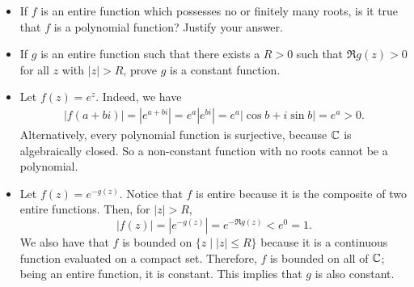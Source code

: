 \begin{problem}
\begin{itemize}
    \item[(a)] If $f$ is an entire function which possesses no or finitely many roots, is it true that $f$ is a polynomial function? Justify your answer. 
    \item[(b)] If $g$ is an entire function such that there exists a $R > 0$ such that $\Re g(z) > 0$ for all $z$ with $|z| > R$, prove $g$ is a constant function.
\end{itemize}
\begin{solution}
\begin{itemize}
    \item[(a)] Let $f(z) = e^z$. Indeed, we have 
    \begin{align*}
        |f(a + bi)| = |e^{a + bi}| = e^a |e^{bi}| = e^a|\cos b + i\sin b| = e^a > 0.
    \end{align*}
    Alternatively, every polynomial function is surjective, because $\mathbb{C}$ is algebraically closed. So a non-constant function with no roots cannot be a polynomial.

    \item[(b)] Let $f(z) = e^{-g(z)}$. Notice that $f$ is entire because it is the composite of two entire functions. Then, for $|z| > R$,
    $$ |f(z)| = |e^{-g(z)}| = e^{-\Re g(z)} < e^0 = 1. $$
    We also have that $f$ is bounded on $\{z \mid |z| \leq R\}$ because it is a continuous function evaluated on a compact set. Therefore, $f$ is bounded on all of $\mathbb{C}$; being an entire function, it is constant. This implies that $g$ is also constant.
\end{itemize}
\end{solution}
\end{problem}

